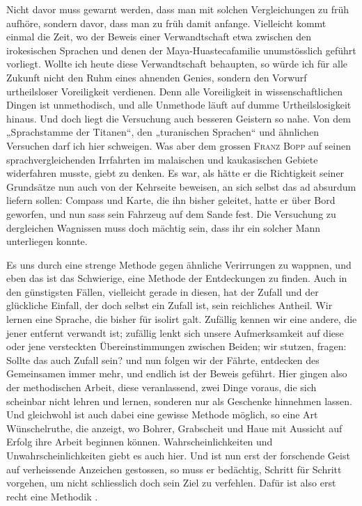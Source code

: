 Nicht davor muss gewarnt werden, dass man mit solchen Vergleichungen zu früh aufhöre, sondern davor, dass man zu früh damit anfange. Vielleicht kommt einmal die Zeit, wo der Beweis einer Ver\label{fp.153}wandtschaft etwa zwischen den irokesischen Sprachen und denen der Maya-Huastecafamilie unumstösslich geführt vorliegt. Wollte ich heute diese Verwandtschaft behaupten, so würde ich für alle Zukunft nicht den Ruhm eines ahnenden Genies, sondern den Vorwurf urth\-eilsloser Voreiligkeit verdienen. Denn alle Voreiligkeit in wissenschaftlichen Dingen ist unmethodisch, und alle Unmethode läuft auf dumme Urtheilslosigkeit hinaus. Und doch liegt die Versuchung auch besseren Geistern so nahe. Von dem „Sprachstamme der Titanen“, den „turanischen Sprachen“ und ähnlichen Versuchen darf ich hier schweigen. Was aber dem grossen \textsc{Franz Bopp} auf seinen sprachvergleichenden Irrfahrten im malaischen und kaukasischen Gebiete widerfahren musste, giebt zu denken. Es war, als hätte er die Richtigkeit seiner Grundsätze nun auch von der Kehrseite beweisen, an sich selbst das  ad absurdum liefern sollen: Compass und Karte, die ihn bisher geleitet, hatte er über Bord geworfen, und nun sass sein Fahrzeug auf dem Sande fest. Die Versuchung zu dergleichen Wagnissen muss doch mächtig sein, dass ihr ein solcher Mann unterliegen konnte.

Es  uns durch eine strenge Methode gegen ähnliche Verirrungen zu wappnen, und eben das ist das Schwierige, eine Methode der Entdeckungen zu finden. Auch in den günstigsten Fällen, vielleicht gerade in diesen, hat der Zufall und der glückliche Einfall, der doch selbst ein Zufall ist, sein reichliches Antheil. Wir lernen eine Sprache, die bisher für isolirt galt. Zufällig kennen wir eine andere, die jener entfernt verwandt ist; zufällig lenkt sich unsere Auf\label{sp.145}merksamkeit auf diese oder jene versteckten Übereinstimmungen zwischen Beiden; wir stutzen, fragen: Sollte das auch Zufall sein? und nun folgen wir der Fährte, entdecken des Gemeinsamen immer mehr, und endlich ist der Beweis geführt. Hier gingen also der methodischen Arbeit, diese veranlassend, zwei Dinge voraus, die sich scheinbar nicht lehren und lernen, sonderen nur als Geschenke hinnehmen lassen. Und gleichwohl ist auch dabei eine gewisse Methode möglich, so eine Art Wünschelruthe, die anzeigt, wo Bohrer, Grabscheit und Haue mit Aussicht auf Erfolg ihre Arbeit beginnen können. Wahrscheinlichkeiten und Unwahrscheinlichkeiten giebt es auch hier. Und ist nun erst der forschende Geist auf verheissende Anzeichen gestossen, so muss er bedächtig, Schritt für Schritt vorgehen, um nicht schliesslich doch sein Ziel zu verfehlen. Dafür ist also erst recht eine Methodik .

